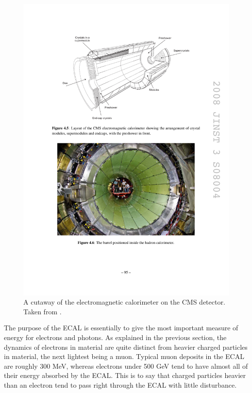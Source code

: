     \begin{figure}[h!]
      \centering
      \includegraphics[width=.9\textwidth]{figures/cms_ecal.pdf}
      \caption{A cutaway of the electromagnetic calorimeter on the CMS detector. Taken from \cite{cms_jinst}.}
      \label{fig:ecal_cutaway}
    \end{figure}

    The purpose of the ECAL is essentially to give the most important measure of energy for electrons and photons. As explained in the previous section, the dynamics of electrons in material are quite distinct from heavier charged particles in material, the next lightest being a muon. Typical muon deposits in the ECAL are roughly 300 MeV\cite{muon_stopping_power}, whereas electrons under 500 GeV tend to have almost all of their energy absorbed by the ECAL\cite[sec. 4.10]{cms_jinst}. This is to say that charged particles heavier than an electron tend to pass right through the ECAL with little disturbance. 

